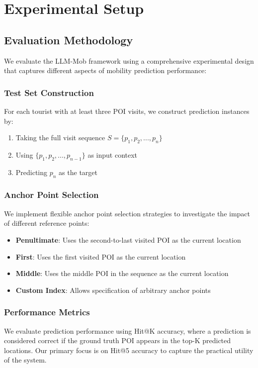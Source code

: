 \documentclass[12pt,a4paper]{article}
\begin{document}
\section{Experimental Setup}

\subsection{Evaluation Methodology}

We evaluate the LLM-Mob framework using a comprehensive experimental design that captures different aspects of mobility prediction performance:

\subsubsection{Test Set Construction}
For each tourist with at least three POI visits, we construct prediction instances by:
\begin{enumerate}
\item Taking the full visit sequence $S = \{p_1, p_2, ..., p_n\}$
\item Using $\{p_1, p_2, ..., p_{n-1}\}$ as input context
\item Predicting $p_n$ as the target
\end{enumerate}

\subsubsection{Anchor Point Selection}
We implement flexible anchor point selection strategies to investigate the impact of different reference points:
\begin{itemize}
\item \textbf{Penultimate}: Uses the second-to-last visited POI as the current location
\item \textbf{First}: Uses the first visited POI as the current location
\item \textbf{Middle}: Uses the middle POI in the sequence as the current location
\item \textbf{Custom Index}: Allows specification of arbitrary anchor points
\end{itemize}

\subsubsection{Performance Metrics}
We evaluate prediction performance using Hit@K accuracy, where a prediction is considered correct if the ground truth POI appears in the top-K predicted locations. Our primary focus is on Hit@5 accuracy to capture the practical utility of the system.
\end{document}
